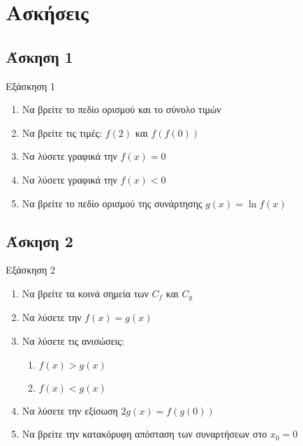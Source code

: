 \documentclass[greek]{beamer}
\begin{document}
\section{Ασκήσεις}

\subsection{Άσκηση 1}
\begin{frame}[label=Άσκηση1,t]{Εξάσκηση 1}
      \href{https://www.geogebra.org/m/jmmx7bp8}{}
      \begin{enumerate}
            \item<1-> Να βρείτε το πεδίο ορισμού και το σύνολο τιμών
            \item Να βρείτε τις τιμές: $f(2)$ και $f(f(0))$
            \item<2-> Να λύσετε γραφικά την $f(x)=0$
            \item<3-> Να λύσετε γραφικά την $f(x)<0$
            \item<4-> Να βρείτε το πεδίο ορισμού της συνάρτησης $g(x)=\ln f(x)$
      \end{enumerate}
\end{frame}

\subsection{Άσκηση 2}
\begin{frame}[label=Άσκηση2,t]{Εξάσκηση 2}
      \href{https://www.geogebra.org/m/td6m58hw}{}
      \begin{enumerate}
            \item<1-> Να βρείτε τα κοινά σημεία των $C_f$ και $C_g$
            \item<2-> Να λύσετε την $f(x)=g(x)$
            \item<3-> Να λύσετε τις ανισώσεις:
                  \begin{enumerate}
                        \item<4-> $f(x)>g(x)$
                        \item<5-> $f(x)<g(x)$
                  \end{enumerate}
            \item<6-> Να λύσετε την εξίσωση $2g(x)=f(g(0))$
            \item<7-> Να βρείτε την κατακόρυφη απόσταση των συναρτήσεων στο $x_0=0$
      \end{enumerate}
\end{frame}
\end{document}
